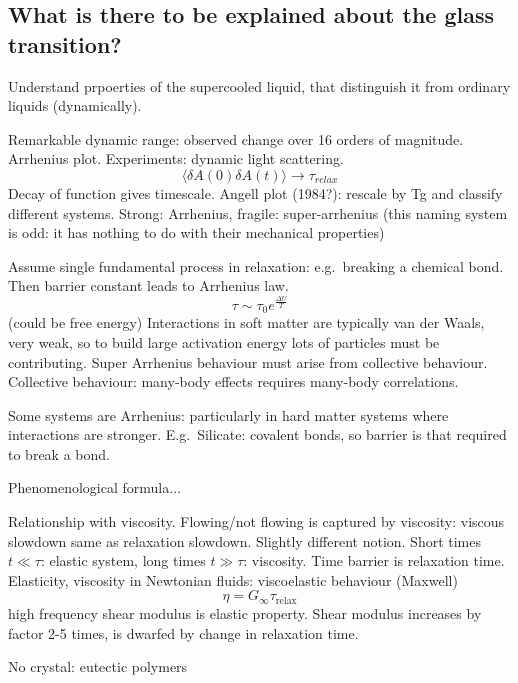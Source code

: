 \subsection{What is there to be explained about the glass transition?}

Understand prpoerties of the supercooled liquid, that distinguish it from ordinary liquids (dynamically).

Remarkable dynamic range: observed change over 16 orders of magnitude.
Arrhenius plot.
Experiments: dynamic light scattering.
\begin{equation}
  \langle \delta A(0) \delta A(t) \rangle
  \to \tau_{relax}
\end{equation}
Decay of function gives timescale.
Angell plot (1984?): rescale by Tg and classify different systems.
Strong: Arrhenius, fragile: super-arrhenius (this naming system is odd: it has nothing to do with their mechanical properties)

Assume single fundamental process in relaxation: e.g.\ breaking a chemical bond.
Then barrier constant leads to Arrhenius law.
\begin{equation}
  \tau \sim \tau_0 e^{\frac{\Delta U}{T}}
\end{equation}
(could be free energy)
Interactions in soft matter are typically van der Waals, very weak, so to build large activation energy lots of particles must be contributing.
Super Arrhenius behaviour must arise from collective behaviour.
Collective behaviour: many-body effects requires many-body correlations.

Some systems are Arrhenius: particularly in hard matter systems where interactions are stronger.
E.g.\ Silicate: covalent bonds, so barrier is that required to break a bond.

Phenomenological formula...

Relationship with viscosity.
Flowing/not flowing is captured by viscosity: viscous slowdown same as relaxation slowdown.
Slightly different notion.
Short times $t \ll \tau$: elastic system, long times $t \gg \tau$: viscosity.
Time barrier is relaxation time.
Elasticity, viscosity in Newtonian fluids: viscoelastic behaviour (Maxwell)
\begin{equation}
  \eta = G_\infty \tau_\mathrm{relax}
\end{equation}
high frequency shear modulus is elastic property.
Shear modulus increases by factor 2-5 times, is dwarfed by change in relaxation time.

No crystal: eutectic polymers

